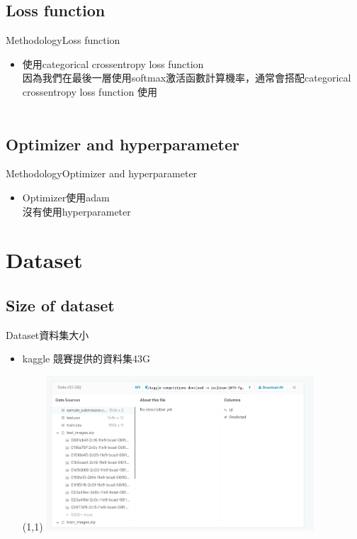 \documentclass{beamer}
\begin{document}
\begin{CJK}{UTF8}{}
\subsection{Loss function}

\begin{frame}{Methodology}{Loss function}
	\begin{itemize}
	\item{
		使用categorical crossentropy loss function\\
		因為我們在最後一層使用softmax激活函數計算機率，通常會搭配categorical crossentropy loss function 使用\\　
	}
	\end{itemize}
\end{frame}

\subsection{Optimizer and hyperparameter}

\begin{frame}{Methodology}{Optimizer and hyperparameter}
	\begin{itemize}
	\item{
		Optimizer使用adam\\
		沒有使用hyperparameter
	}
	\end{itemize}
\end{frame}

\section{Dataset}

\subsection{Size of dataset}

\begin{frame}{Dataset}{資料集大小}
\vspace{-4.5cm}
	\begin{itemize}
	\item{
		kaggle 競賽提供的資料集43G
		\begin{textblock}{3}(1,1)
		\includegraphics[width=10cm]{dataset.png}
		\end{textblock}
	}
	\end{itemize}
\end{frame}


\end{CJK}
\end{document}
